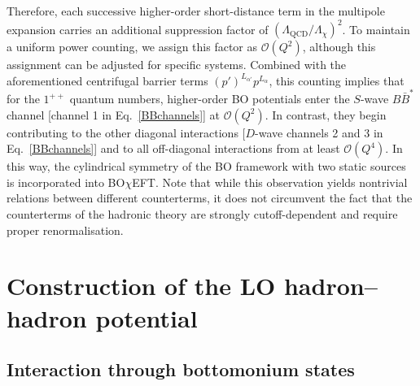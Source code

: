 \documentclass[aps,prd,showpacs,amsmath,twocolumn,superscriptaddress,floatfix,nofootinbib,notitlepage]{revtex4-2}
\newcommand{\BOchiEFT}{BO$\chi$EFT\xspace}
\begin{document}
Therefore, each successive higher-order short-distance term in the multipole expansion carries an additional suppression factor of $(\Lambda_\text{QCD}/\Lambda_\chi)^2$. To maintain a uniform power counting,  we assign this factor as $\mathcal{O}(Q^2)$, although this assignment can be adjusted for specific systems. 
Combined with the aforementioned centrifugal barrier terms $(p')^{L_{\alpha'}}p^{L_\alpha}$, this counting implies that for the $1^{++}$ quantum numbers, higher-order BO potentials enter the $S$-wave $B\bar{B}^*$ channel [channel 1 in Eq.~\eqref{BBchannels}] at $\mathcal{O}(Q^2)$. In contrast, they begin contributing to the other diagonal interactions [$D$-wave channels 2 and 3 in Eq.~\eqref{BBchannels}] and to all off-diagonal interactions from at least $\mathcal{O}(Q^4)$. 
In this way, the cylindrical symmetry of the BO framework with two static sources is incorporated into \BOchiEFT. Note that while this observation yields nontrivial relations between different counterterms, it does not circumvent the fact that the counterterms of the hadronic theory are strongly cutoff-dependent and require proper renormalisation.

\section{Construction of the LO hadron--hadron potential}
\label{sec:potential}

\subsection{Interaction through bottomonium states}
\label{sec:VQM}
\end{document}
